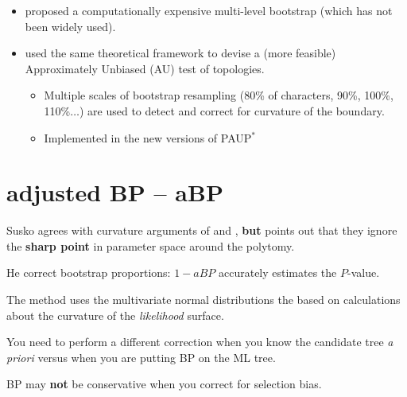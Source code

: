 \documentclass[landscape]{foils}
\begin{document}
\myNewSlide
\begin{itemize}
	\item \citet{EfronHH1996}  proposed a computationally expensive multi-level bootstrap (which has not been widely used).
	\item \citet{Shimodaira2002} used the same theoretical framework to devise a (more feasible) Approximately Unbiased (AU) test of topologies.
	\begin{itemize}
		\item Multiple scales of bootstrap resampling (80\% of characters, 90\%, 100\%, 110\%$\ldots$) are used to detect and correct for curvature of the boundary.
		\item Implemented in the new versions of PAUP$^{\ast}$
	\end{itemize}
\end{itemize}


\myNewSlide
\section*{\cite{Susko2010} adjusted BP -- aBP}
\large
\begin{compactitem}
	\item Susko agrees with curvature arguments of \citet{EfronHH1996} and \citet{Shimodaira2002}, {\bf but} points out that they ignore the {\bf sharp point} in parameter space around the polytomy.

	\item He correct bootstrap proportions:  $1-aBP$ accurately estimates the $P$-value.

	\item The method uses the multivariate normal distributions the based on calculations about the curvature of the {\em likelihood} surface.

	\item You need to perform a different correction when you know the candidate tree {\em a priori} versus when you are putting BP on the ML tree.

	\item BP may {\bf not} be conservative when you correct for selection bias.
\end{compactitem}
\end{document}
